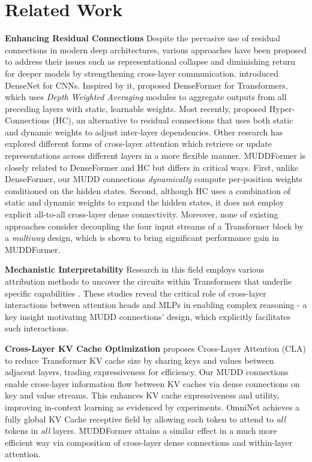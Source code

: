 \section{Related Work}
\label{related_work}
\textbf{Enhancing Residual Connections}
Despite the pervasive use of residual connections \cite{he2016deep} in modern deep architectures, various approaches have been proposed to address their issues such as representational collapse and diminishing return for deeper models by strengthening cross-layer communication.
\citet{huang2017densely} introduced DenseNet for CNNs.
Inspired by it, \citet{pagliardini2024denseformer} proposed DenseFormer for Transformers, which uses \emph{Depth Weighted Averaging} modules to aggregate outputs from all preceding layers with static, learnable weights. 
Most recently, \citet{zhu2024hyper} proposed Hyper-Connections (HC), an alternative to residual connections that uses both static and dynamic weights to adjust inter-layer dependencies.
Other research has explored different forms of cross-layer attention \cite{elnokrashy2022depth,fang2023cross,wang2024strengthening}
which retrieve or update representations across different layers in a more flexible manner.
MUDDFormer is closely related to DenseFormer and HC but differs in critical ways. 
First, unlike DenseFormer, our MUDD connections \emph{dynamically} compute per-position weights conditioned on the hidden states. 
Second, although HC uses a combination of static and dynamic weights to expand the hidden states, it does not employ explicit all-to-all cross-layer dense connectivity. 
Moreover, none of existing approaches consider decoupling the four input streams of a Transformer block by a \emph{multiway} design, which is shown to bring significant performance gain in MUDDFormer. 

\textbf{Mechanistic Interpretability}
Research in this field employs various attribution methods \cite{conmy2023towards,hanna2024have} to uncover the circuits within Transformers that underlie specific capabilities \cite{Elhage2021mathematical,wang2024strengthening,ni2024benchmarking}. 
These studies reveal the critical role of cross-layer interactions between attention heads and MLPs in enabling complex reasoning - a key insight motivating MUDD connections' design, which explicitly facilitates such interactions.

\textbf{Cross-Layer KV Cache Optimization} 
\citet{brandon2024reducing} proposes Cross-Layer Attention (CLA) to reduce Transformer KV cache size by sharing keys and values between adjacent layers, trading expressiveness for efficiency. 
Our MUDD connections enable cross-layer information flow between KV caches via dense connections on key and value streams.
This enhances KV cache expressiveness and utility, improving in-context learning as evidenced by experiments.
OmniNet \cite{tay2021omninet} achieves a fully global KV Cache receptive field by allowing each token to attend to \emph{all} tokens in \emph{all} layers.
MUDDFormer attains a similar effect in a much more efficient way via composition of cross-layer dense connections and within-layer attention.

